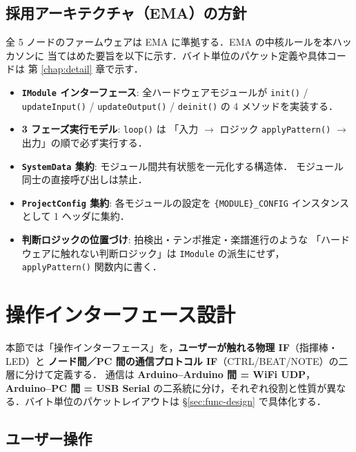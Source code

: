 \documentclass[lualatex,book,paper=a4paper,jafontsize=11.5pt,jafontscale=1.05]{jlreq}
\begin{document}
\subsection{採用アーキテクチャ（EMA）の方針}

全 5 ノードのファームウェアは EMA に準拠する．EMA の中核ルールを本ハッカソンに
当てはめた要旨を以下に示す．バイト単位のパケット定義や具体コードは
第 \ref{chap:detail} 章で示す．

\begin{itemize}
  \item \textbf{\texttt{IModule} インターフェース}: 全ハードウェアモジュールが
        \texttt{init()} / \texttt{updateInput()} / \texttt{updateOutput()} / \texttt{deinit()}
        の 4 メソッドを実装する．
  \item \textbf{3 フェーズ実行モデル}: \texttt{loop()} は
        「入力 $\to$ ロジック \texttt{applyPattern()} $\to$ 出力」の順で必ず実行する．
  \item \textbf{\texttt{SystemData} 集約}: モジュール間共有状態を一元化する構造体．
        モジュール同士の直接呼び出しは禁止．
  \item \textbf{\texttt{ProjectConfig} 集約}: 各モジュールの設定を
        \texttt{\{MODULE\}\_CONFIG} インスタンスとして 1 ヘッダに集約．
  \item \textbf{判断ロジックの位置づけ}: 拍検出・テンポ推定・楽譜進行のような
        「ハードウェアに触れない判断ロジック」は \texttt{IModule} の派生にせず，
        \texttt{applyPattern()} 関数内に書く．
\end{itemize}


\section{操作インターフェース設計}\label{sec:basic-ui}

本節では「操作インターフェース」を，\textbf{ユーザーが触れる物理 IF}（指揮棒・LED）と
\textbf{ノード間／PC 間の通信プロトコル IF}（CTRL/BEAT/NOTE）の二層に分けて定義する．
通信は \textbf{Arduino--Arduino 間 = WiFi UDP}，\textbf{Arduino--PC 間 = USB Serial}
の二系統に分け，それぞれ役割と性質が異なる．バイト単位のパケットレイアウトは
\S\ref{sec:func-design} で具体化する．

\subsection{ユーザー操作}
\end{document}
